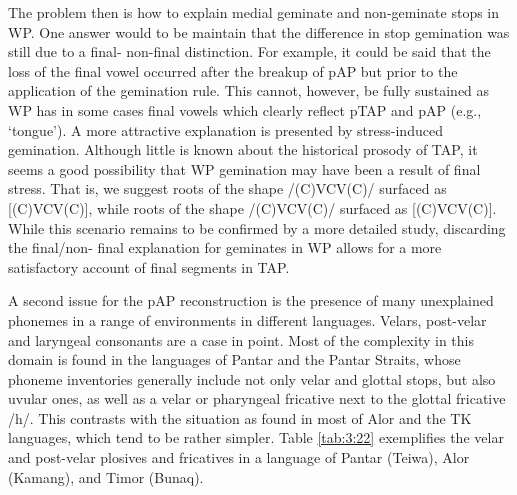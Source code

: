 \documentclass[output=paper]{LSP/langsci}
\begin{document}
 

The problem then is how to explain medial geminate and non-geminate stops in WP. One answer would to be maintain that the difference in stop gemination was still due to a final- non-final distinction. For example, it could be said that the loss of the final vowel occurred after the breakup of pAP but prior to the application of the gemination rule. This cannot, however, be fully sustained as WP has in some cases final vowels which clearly reflect pTAP and pAP (e.g., `tongue'). A more attractive explanation is presented by stress-induced gemination. Although little is known about the historical prosody of TAP, it seems a good possibility that WP gemination may have been a result of final stress. That is, we suggest roots of the shape /(C)V{\textprimstress}CV(C)/ surfaced as [(C)V{\textprimstress}C{\textlengthmark}V(C)], while roots of the shape /{\textprimstress}(C)VCV(C)/ surfaced as [{\textprimstress}(C)VCV(C)]. While this scenario remains to be confirmed by a more detailed study, discarding the final/non-
final explanation for geminates in WP allows for a more satisfactory account of final segments in TAP.

A second issue for the pAP reconstruction is the presence of many unexplained phonemes in a range of environments in different languages. Velars, post-velar and laryngeal consonants are a case in point. Most of the complexity in this domain is found in the languages of Pantar and the Pantar Straits, whose phoneme inventories generally include not only velar and glottal stops, but also uvular ones, as well as a velar or pharyngeal fricative next to the glottal fricative /h/. This contrasts with the situation as found in most of Alor and the TK languages, which tend to be rather simpler. Table \ref{tab:3:22} exemplifies the velar and post-velar plosives and fricatives in a language of Pantar (Teiwa), Alor (Kamang), and Timor (Bunaq).
 
\end{document}
